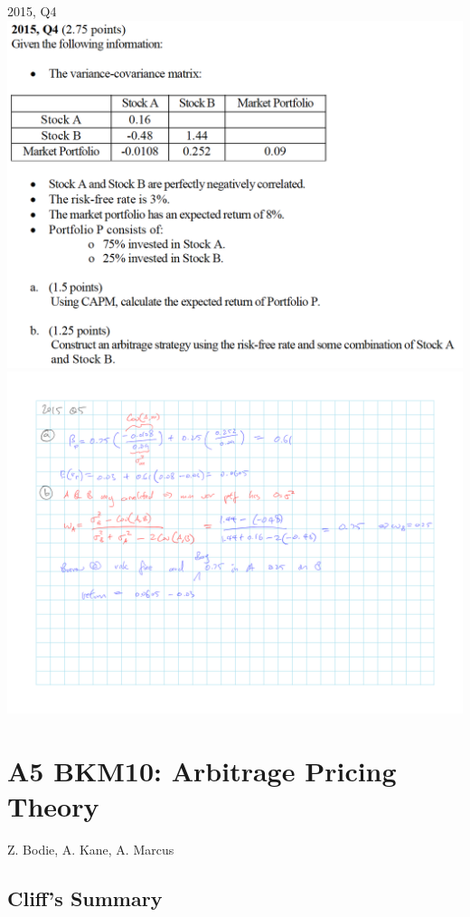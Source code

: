 \documentclass[]{book}
\theoremstyle{definition}
\theoremstyle{definition}
\theoremstyle{remark}
\begin{document}
 2015, Q4 \includegraphics{questions/2015-4Q.png}
\includegraphics{questions/2015-4A.png}

\chapter{A5 BKM10: Arbitrage Pricing
Theory}\label{a5-bkm10-arbitrage-pricing-theory}

Z. Bodie, A. Kane, A. Marcus

\section{Cliff's Summary}\label{cliffs-summary-4}
\end{document}

